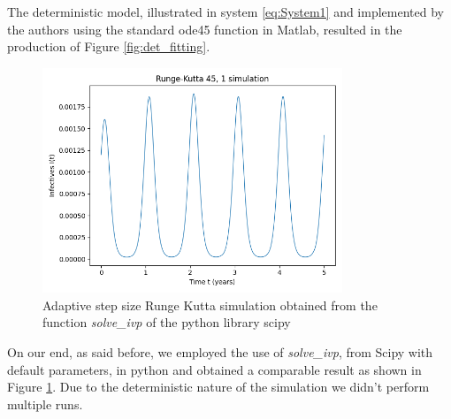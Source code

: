 The deterministic model, illustrated in system \ref{eq:System1} and implemented by the authors using the standard ode45 function in Matlab, resulted in the production of Figure \ref{fig:det_fitting}.
\begin{figure}[ht]
  \centering
  \includegraphics[width=0.8\textwidth]{IMG/2Det_solve_ivp_I(t).png}
  \caption{Adaptive step size Runge Kutta simulation obtained from the function \textit{solve\_ivp} of the python library scipy}
  \label{solve_ivp}
\end{figure}
 On our end, as said before, we employed the use of \textit{solve\_ivp}, from Scipy\cite{2020SciPy-NMeth} with default parameters, in python and obtained a comparable result as shown in Figure \ref{solve_ivp}. Due to the deterministic nature of the simulation we didn't perform multiple runs.
